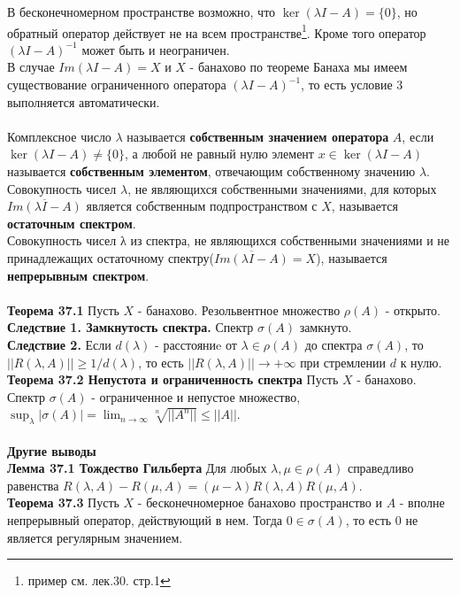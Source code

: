 \documentclass{article}
\begin{document}
	В бесконечномерном пространстве возможно, что $\ker (\lambda I-A)=\{0\}$, но обратный оператор действует не на всем пространстве\footnote{пример см. лек.30. стр.1}. Кроме того оператор ${(\lambda I-A)}^{-1}$ может быть и неограничен.\\
	В случае $Im(\lambda I-A)=X$ и $X$ - банахово по
	теореме Банаха мы имеем существование ограниченного оператора ${(\lambda I-A)}^{-1}$, то есть условие 3 выполняется автоматически.\\
	\\
	Комплексное число $\lambda$ называется \textbf{собственным значением оператора} $A$,	если $\ker (\lambda I-A)\ne \{0\}$, а любой не равный нулю элемент $x\in \ker (\lambda I-A)$ называется
	\textbf{собственным элементом}, отвечающим собственному значению $\lambda$.\\
	Совокупность чисел $\lambda$, не являющихся собственными значениями, для которых $\overline{Im(\lambda I-A)}$ является собственным подпространством с $X$, называется \textbf{остаточным спектром}.\\
	Совокупность чисел λ из спектра, не являющихся собственными значениями и не принадлежащих остаточному спектру($\overline{Im(\lambda I-A)}=X$), называется \textbf{непрерывным спектром}.\\
	\\
	\textbf{Теорема 37.1} Пусть $X$ - банахово. Резольвентное множество $\rho(A)$ - открыто.\\
	\textbf{Следствие 1. Замкнутость спектра.} Спектр $\sigma(A)$ замкнуто.\\
	\textbf{Следствие 2.} Если $d(\lambda)$ - расстояниe от $\lambda \in \rho(A)$ до спектра $\sigma(A)$, то $||R(\lambda,A)||\ge 1/d(\lambda)$, то есть $||R(\lambda,A)||\rightarrow +\infty$ при стремлении $d$ к нулю. \\
	\textbf{Теорема 37.2 Непустота и ограниченность спектра} Пусть $X$ - банахово. Спектр $\sigma(A)$ - ограниченное и непустое множество, $\sup_{\lambda} |\sigma(A)|=\lim_{n\rightarrow \infty} \sqrt[n]{||{A}^{n}||}\le ||A||$.\\
	\\
	\textbf{Другие выводы}\\
	\textbf{Лемма 37.1 Тождество Гильберта} Для любых $\lambda, \mu \in \rho(A)$ справедливо равенства $R(\lambda,A)-R(\mu,A)=(\mu-\lambda)R(\lambda,A)R(\mu,A)$.\\
	\textbf{Теорема 37.3} Пусть $X$ - бесконечномерное банахово пространство и $A$ - вполне непрерывный оператор, действующий в нем. Тогда $0\in \sigma(A)$, то есть 0 не является регулярным значением.\\
\end{document}

